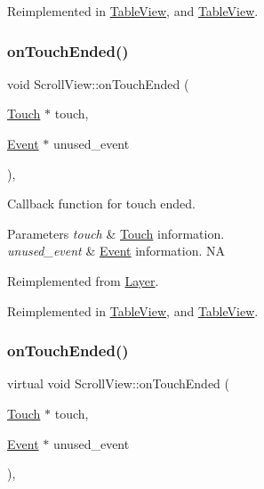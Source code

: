 Reimplemented in \hyperlink{classTableView_a5ed81baf58526698abefaf8ca08a6c01}{Table\+View}, and \hyperlink{classTableView_a743113e92ef98837c4cfdacf40fd0a0f}{Table\+View}.

\mbox{\label{classScrollView_a86f57715da926a475b75d67eff84701d}} 
\subsubsection{\texorpdfstring{on\+Touch\+Ended()}{onTouchEnded()}\hspace{0.1cm}{\footnotesize\ttfamily [1/2]}}
{\footnotesize\ttfamily void Scroll\+View\+::on\+Touch\+Ended (\begin{DoxyParamCaption}\item[{\hyperlink{classTouch}{Touch} $\ast$}]{touch,  }\item[{\hyperlink{classEvent}{Event} $\ast$}]{unused\+\_\+event }\end{DoxyParamCaption})\hspace{0.3cm}{\ttfamily [override]}, {\ttfamily [virtual]}}

Callback function for touch ended.


\begin{DoxyParams}{Parameters}
{\em touch} & \hyperlink{classTouch}{Touch} information. \\
\hline
{\em unused\+\_\+event} & \hyperlink{classEvent}{Event} information.  NA \\
\hline
\end{DoxyParams}


Reimplemented from \hyperlink{classLayer_a9dbcca0eab3b0cd3cdc279615c604413}{Layer}.



Reimplemented in \hyperlink{classTableView_a0d96aaf8ac40256ed144565beaaf76aa}{Table\+View}, and \hyperlink{classTableView_a361d91c5c592b3d81ed43b6743487fc3}{Table\+View}.

\mbox{\label{classScrollView_aafc1076e1f21bc66749a4c814814d681}} 
\subsubsection{\texorpdfstring{on\+Touch\+Ended()}{onTouchEnded()}\hspace{0.1cm}{\footnotesize\ttfamily [2/2]}}
{\footnotesize\ttfamily virtual void Scroll\+View\+::on\+Touch\+Ended (\begin{DoxyParamCaption}\item[{\hyperlink{classTouch}{Touch} $\ast$}]{touch,  }\item[{\hyperlink{classEvent}{Event} $\ast$}]{unused\+\_\+event }\end{DoxyParamCaption})\hspace{0.3cm}{\ttfamily [override]}, {\ttfamily [virtual]}}

